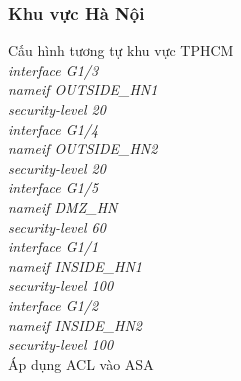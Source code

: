 \documentclass[12pt,a4paper]{report}
\begin{document}
\subsubsection{Khu vực Hà Nội}
\hspace*{0.25cm}Cấu hình tương tự khu vực TPHCM\\
\hspace*{2cm}\textit{interface G1/3\\
\hspace*{2cm}nameif  OUTSIDE\_HN1\\
\hspace*{2cm}security-level 20\\
\hspace*{2cm}interface G1/4\\
\hspace*{2cm}nameif OUTSIDE\_HN2\\
\hspace*{2cm}security-level 20\\
\hspace*{2cm}interface G1/5 \\
\hspace*{2cm}nameif DMZ\_HN\\
\hspace*{2cm}security-level 60\\
\hspace*{2cm}interface G1/1 \\
\hspace*{2cm}nameif INSIDE\_HN1\\
\hspace*{2cm}security-level 100 \\
\hspace*{2cm}interface G1/2 \\
\hspace*{2cm}nameif INSIDE\_HN2\\
\hspace*{2cm}security-level 100\\}
\hspace*{1cm}Áp dụng ACL vào ASA\\
\end{document}
